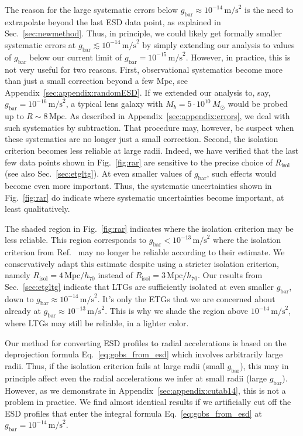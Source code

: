 \documentclass[a4paper,11pt]{article}
\newcommand{\gbar}{\ensuremath{g_{\mathrm{bar}}}}
\begin{document}
The reason for the large systematic errors below $\gbar \approx 10^{-14}\,\mathrm{m/s}^2$ is the need to extrapolate beyond the last ESD data point, as explained in Sec.~\ref{sec:newmethod}.
Thus, in principle, we could likely get formally smaller systematic errors at $g_{\mathrm{bar}} \lesssim 10^{-14}\,\mathrm{m/s}^2$ by simply extending our analysis to values of $g_{\mathrm{bar}}$ below our current limit of $g_{\mathrm{bar}} = 10^{-15}\,\mathrm{m/s}^2$.
However, in practice, this is not very useful for two reasons.
First, observational systematics become more than just a small correction beyond a few $\mathrm{Mpc}$, see Appendix~\ref{sec:appendix:randomESD}.
If we extended our analysis to, say, $\gbar = 10^{-16}\,\mathrm{m/s}^2$, a typical lens galaxy with $M_b = 5 \cdot 10^{10}\,M_\odot$ would be probed up to $R \sim 8\,\mathrm{Mpc}$.
As described in Appendix~\ref{sec:appendix:errors}, we deal with such systematics by subtraction.
That procedure may, however, be suspect when these systematics are no longer just a small correction.
Second, the isolation criterion becomes less reliable at large radii.
Indeed, we have verified that the last few data points shown in Fig.~\ref{fig:rar} are sensitive to the precise choice of $R_{\mathrm{isol}}$ (see also Sec.~\ref{sec:etgltg}).
At even smaller values of $g_{\mathrm{bar}}$, such effects would become even more important.
Thus, the systematic uncertainties shown in Fig.~\ref{fig:rar} do indicate where systematic uncertainties become important, at least qualitatively.

The shaded region in Fig.~\ref{fig:rar} indicates where the isolation criterion may be less reliable.
This region corresponds to $\gbar < 10^{-13}\,\mathrm{m/s}^2$ where the isolation criterion from Ref.~\cite{Brouwer2021} may no longer be reliable according to their estimate.
We conservatively adapt this estimate despite using a stricter isolation criterion, namely $R_{\mathrm{isol}} = 4\,\mathrm{Mpc}/h_{70}$ instead of $R_{\mathrm{isol}} = 3\,\mathrm{Mpc}/h_{70}$.
Our results from Sec.~\ref{sec:etgltg} indicate that LTGs are sufficiently isolated at even smaller $\gbar$, down to $\gbar \approx 10^{-14}\,\mathrm{m/s}^2$.
It's only the ETGs that we are concerned about already at $\gbar \approx 10^{-13}\,\mathrm{m/s}^2$.
This is why we shade the region above $10^{-14}\,\mathrm{m/s}^2$, where LTGs may still be reliable, in a lighter color.

Our method for converting ESD profiles to radial accelerations is based on the deprojection formula Eq.~\eqref{eq:gobs_from_esd} which involves arbitrarily large radii.
Thus, if the isolation criterion fails at large radii (small $g_{\mathrm{bar}}$), this may in principle affect even the radial accelerations we infer at small radii (large $g_{\mathrm{bar}}$).
However, as we demonstrate in Appendix~\ref{sec:appendix:cutab14}, this is not a problem in practice.
We find almost identical results if we artificially cut off the ESD profiles that enter the integral formula Eq.~\eqref{eq:gobs_from_esd} at $g_{\mathrm{bar}} = 10^{-14}\,\mathrm{m/s}^2$.
\end{document}
